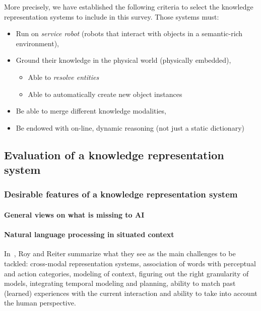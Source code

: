 \documentclass[a4paper]{article}
\begin{document}
More precisely, we have established the following criteria to select the
knowledge representation systems to include in this survey. Those systems must:

\begin{itemize}
	\item  Run on \emph{service robot} (robots that interact with objects in a
	semantic-rich environment),

	\item  Ground their knowledge in the physical world (physically embedded),
	\begin{itemize}
		\item  Able to \emph{resolve entities}
		\item  Able to automatically create new object instances
	\end{itemize}

	\item  Be able to merge different knowledge modalities,
	\item  Be endowed with on-line, dynamic reasoning (not just a static
	dictionary)

\end{itemize}

\subsection{Evaluation of a knowledge representation system}
\label{sect|evaluation}


\subsubsection{Desirable features of a knowledge representation system}
\label{sect|evaluation-literature}

\paragraph{General views on what is missing to AI} \cite{McCarthy2007}

\paragraph{Natural language processing in situated context}
In~\cite{Roy2005}, Roy and Reiter summarize what they see as the main
challenges to be tackled: cross-modal representation systems, association of
words with perceptual and action categories, modeling of context, figuring out
the right granularity of models, integrating temporal modeling and planning,
ability to match past (learned) experiences with the current interaction and
ability to take into account the human perspective.
\end{document}
